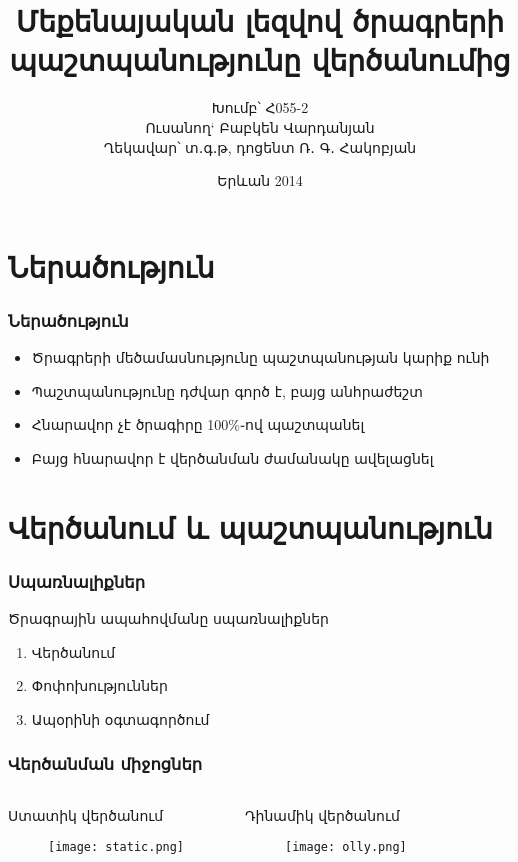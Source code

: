 \documentclass[11pt]{beamer}
\title[Մեքենայական լեզվով ծրագրերի պաշտպանությունը վերծանումից]{Մեքենայական լեզվով ծրագրերի պաշտպանությունը վերծանումից}
\author{Խումբ՝ Հ055-2\\Ուսանող` Բաբկեն Վարդանյան\\Ղեկավար՝ տ․գ․թ, դոցենտ Ռ․ Գ․ Հակոբյան}
\institute[ՀՊՃՀ]{Հայաստանի Պետական Ճարտարագիտական Համալսարան\\Քոմփյութերային Համակարգերի և Ինֆորմատիկայի Ֆակուլտետ}
\date{Երևան 2014}
\begin{document}
\begin{frame}
\titlepage
\end{frame}


\section{Ներածություն}

\begin{frame}\frametitle{Ներածություն}
\begin{itemize}
\item Ծրագրերի մեծամասնությունը պաշտպանության կարիք ունի
\item Պաշտպանությունը դժվար գործ է, բայց անհրաժեշտ
\item Հնարավոր չէ ծրագիրը 100\%֊ով պաշտպանել
\item Բայց հնարավոր է վերծանման ժամանակը ավելացնել
\end{itemize}
\end{frame}

\section{Վերծանում և պաշտպանություն}

\begin{frame}\frametitle{Սպառնալիքներ}
Ծրագրային ապահովմանը սպառնալիքներ
\begin{enumerate}
\item Վերծանում
\item Փոփոխություններ
\item Ապօրինի օգտագործում
\end{enumerate}
\end{frame}

\begin{frame}\frametitle{Վերծանման միջոցներ}
\begin{columns}[t]
\begin{block}{Ստատիկ վերծանում}
\begin{figure}[p]
\centering
\texttt{[image: static.png]}
\end{figure}
\end{block}
\begin{block}{Դինամիկ վերծանում}
\begin{figure}[p]
\centering
\texttt{[image: olly.png]}
\end{figure}
\end{block}
\end{columns}
\end{frame}
\end{document}
